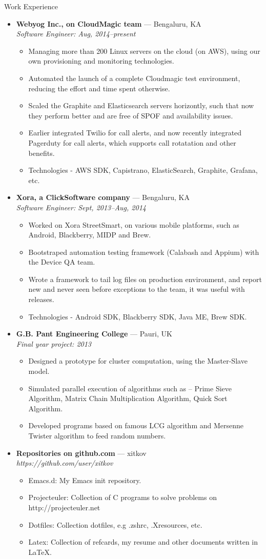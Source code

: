 \documentclass[11pt,oneside]{article}
\newenvironment{ressection}[1]{
  \vspace{4pt}
         {\fontfamily{phv}\selectfont\Large#1}
         \begin{itemize}
           \vspace{3pt}
}{
         \end{itemize}
}
\newcommand{\ressubitem}[1]{
  \vspace{-1pt}
\item \begin{flushleft} #1 \end{flushleft}
}
\newcommand{\resbigitem}[3]{
  \vspace{-5pt}
\item
  \textbf{#1} --- #2 \\
  \textit{#3}
}
\newenvironment{ressubsec}[3]{
  \resbigitem{#1}{#2}{#3}
  \vspace{-2pt}
  \begin{itemize}
}{
  \end{itemize}
}
\begin{document}
\begin{ressection}{Work Experience}
  \begin{ressubsec}{Webyog Inc., on CloudMagic team}{Bengaluru, KA}{Software Engineer: Aug, 2014--present}
    \ressubitem{Managing more than 200 Linux servers on the cloud (on AWS), using our own provisioning and monitoring technologies.}
    \ressubitem{Automated the launch of a complete Cloudmagic test environment, reducing the effort and time spent otherwise.}
    \ressubitem{Scaled the Graphite and Elasticsearch servers horizontly, such that now they perform better and are free of SPOF and availability issues.}
    \ressubitem{Earlier integrated Twilio for call alerts, and now recently integrated Pagerduty for call alerts, which supports call rotatation and other benefits.}
    \ressubitem{Technologies - AWS SDK, Capistrano, ElasticSearch, Graphite, Grafana, etc.}
  \end{ressubsec}
  \begin{ressubsec}{Xora, a ClickSoftware company}{Bengaluru, KA}{Software Engineer: Sept, 2013--Aug, 2014}
    \ressubitem{Worked on Xora StreetSmart, on various mobile platforms, such as Android, Blackberry, MIDP and Brew.}
    \ressubitem{Bootstraped automation testing framework (Calabash and Appium) with the Device QA team.}
    \ressubitem{Wrote a framework to tail log files on production environment, and report new and never seen before exceptions to the team, it was useful with releases.}
    \ressubitem{Technologies - Android SDK, Blackberry SDK, Java ME, Brew SDK.}
  \end{ressubsec}
  \begin{ressubsec}{G.B. Pant Engineering College}{Pauri, UK}{Final year project: 2013}
    \ressubitem{Designed a prototype for cluster computation, using the Master-Slave model.}
    \ressubitem{Simulated parallel execution of algorithms such as -- Prime Sieve Algorithm, Matrix Chain Multiplication Algorithm, Quick Sort Algorithm.}
    \ressubitem{Developed programs based on famous LCG algorithm and Mersenne Twister algorithm to feed random numbers.}
  \end{ressubsec}
  \begin{ressubsec}{Repositories on github.com}{xitkov}{https://github.com/user/xitkov}
    \ressubitem{Emacs.d: My Emacs init repository.}
    \ressubitem{Projecteuler: Collection of C programs to solve problems on http://projecteuler.net}
    \ressubitem{Dotfiles: Collection dotfiles, e.g .zshrc, .Xresources, etc.}
    \ressubitem{Latex:  Collection of refcards, my resume and other documents written in \LaTeX.}
  \end{ressubsec}
\end{ressection}
\end{document}
